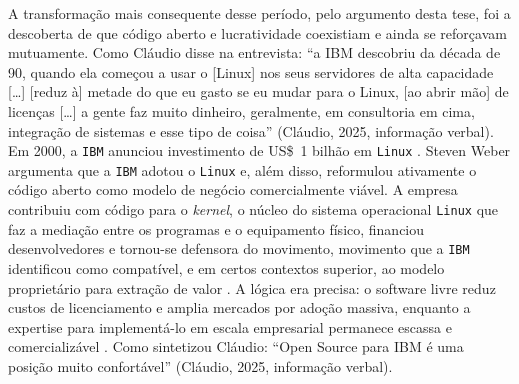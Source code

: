 A transformação mais consequente desse período, pelo argumento desta tese, foi a descoberta de que código aberto e lucratividade coexistiam e ainda se reforçavam mutuamente. Como Cláudio disse na entrevista: \enquote{a IBM descobriu da década de 90, quando ela começou a usar o [Linux] nos seus servidores de alta capacidade [\ldots] [reduz à] metade do que eu gasto se eu mudar para o Linux, [ao abrir mão] de licenças [\ldots] a gente faz muito dinheiro, geralmente, em consultoria em cima, integração de sistemas e esse tipo de coisa} (Cláudio, 2025, informação verbal). Em 2000, a \texttt{IBM} anunciou investimento de US\$~1 bilhão em \texttt{Linux} \parencite{IBM_Linux_2000}. Steven Weber argumenta que a \texttt{IBM} adotou o \texttt{Linux} e, além disso, reformulou ativamente o código aberto como modelo de negócio comercialmente viável. A empresa contribuiu com código para o \emph{kernel}, o núcleo do sistema operacional \texttt{Linux} que faz a mediação entre os programas e o equipamento físico, financiou desenvolvedores e tornou-se defensora do movimento, movimento que a \texttt{IBM} identificou como compatível, e em certos contextos superior, ao modelo proprietário para extração de valor \parencite[p.~89]{weber2004success}. A lógica era precisa: o software livre reduz custos de licenciamento e amplia mercados por adoção massiva, enquanto a expertise para implementá-lo em escala empresarial permanece escassa e comercializável \parencite{IBM_RedHat_2019}. Como sintetizou Cláudio: \enquote{Open Source para IBM é uma posição muito confortável} (Cláudio, 2025, informação verbal).

